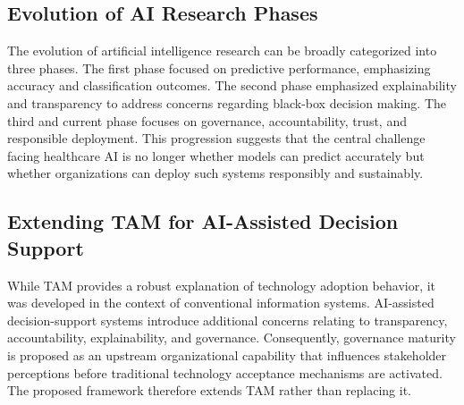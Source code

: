 \subsection{Evolution of AI Research Phases}
\label{sec:evolution_ai_research}

\noindent The evolution of artificial intelligence research can be broadly categorized into three phases. The first phase focused on predictive performance, emphasizing accuracy and classification outcomes. The second phase emphasized explainability and transparency to address concerns regarding black-box decision making. The third and current phase focuses on governance, accountability, trust, and responsible deployment. This progression suggests that the central challenge facing healthcare AI is no longer whether models can predict accurately but whether organizations can deploy such systems responsibly and sustainably.


\subsection{Extending TAM for AI-Assisted Decision Support}
\label{sec:extending_tam_for_ai}

\noindent While TAM provides a robust explanation of technology adoption behavior, it was developed in the context of conventional information systems. AI-assisted decision-support systems introduce additional concerns relating to transparency, accountability, explainability, and governance. Consequently, governance maturity is proposed as an upstream organizational capability that influences stakeholder perceptions before traditional technology acceptance mechanisms are activated. The proposed framework therefore extends TAM rather than replacing it.



